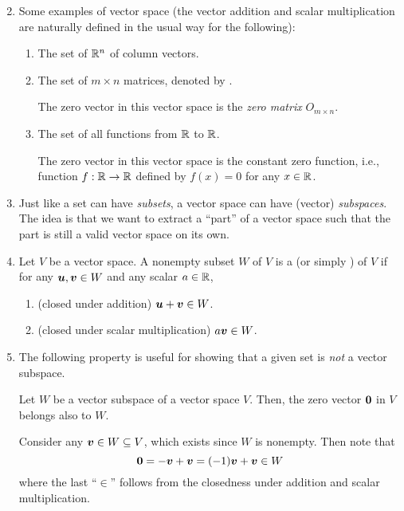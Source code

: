 \begin{enumerate}
\begin{pf}
\begin{enumerate}
\[\]
\end{enumerate}
\end{pf}
\item Some examples of vector space (the vector addition and scalar
multiplication are naturally defined in the usual way for the following):
\begin{enumerate}
\item The set of \(\mathbb{R}^n\) of column vectors.
\item The set of \(m\times n\) matrices, denoted by .
\begin{note}
The zero vector in this vector space is the \emph{zero matrix} \(O_{m\times n}\).
\end{note}
\item The set of all functions from \(\mathbb{R}\) to \(\mathbb{R}\).
\begin{note}
The zero vector in this vector space is the constant zero function, i.e.,
function \(f:\mathbb{R} \to\mathbb{R}\) defined by \(f(x)=0\) for any \(x\in\mathbb{R}\).
\end{note}
\end{enumerate}
\item Just like a set can have \emph{subsets}, a vector space can have (vector)
\emph{subspaces}. The idea is that we want to extract a ``part'' of a vector
space such that the part is still a valid vector space on its own.

\item Let \(V\) be a vector space. A nonempty subset \(W\) of \(V\) is a
 (or simply ) of \(V\) if for any
\(\vb*{u},\vb*{v}\in W\) and any scalar \(a\in\mathbb{R}\),
\begin{enumerate}
\item (closed under addition) \(\vb*{u}+\vb*{v}\in W\).
\item (closed under scalar multiplication) \(a\vb*{v}\in W\).
\end{enumerate}
\item The following property is useful for showing that a given set is
\emph{not} a vector subspace.
\begin{proposition}
\label{prp:vec-subsp-contain-zero}
Let \(W\) be a vector subspace of a vector space \(V\). Then, the zero vector
\(\vb*{0}\) in \(V\) belongs also to \(W\).
\end{proposition}
\begin{pf}
Consider any \(\vb*{v}\in W\subseteq V\), which exists since \(W\) is
nonempty. Then note that
\[
\vb*{0}=-\vb*{v}+\vb*{v}=(-1)\vb*{v}+\vb*{v}\in W
\]
where the last ``\(\in\)'' follows from the closedness under addition and
scalar multiplication.
\end{pf}


\end{enumerate}
